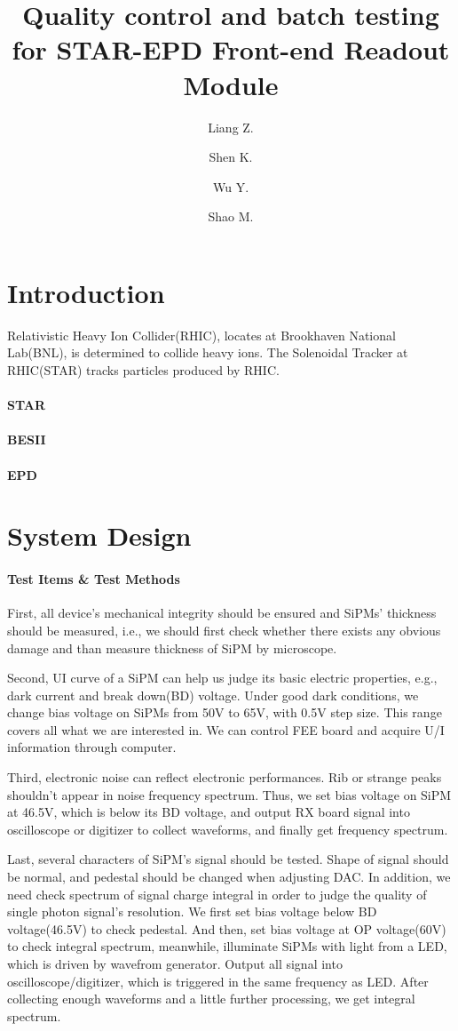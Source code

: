 \documentclass[11pt,a4paper]{article}
\title{Quality control and batch testing for STAR-EPD Front-end Readout Module}
\author[a]{Liang Z.}
\author[a]{Shen K.}
\author[a]{Wu Y.}
\author[a]{Shao M.}
\affiliation[a]{University of Science and Technology of China, JinZhai Road, HEFEI, China}
\begin{document}
\maketitle
\flushbottom

\section{Introduction}
Relativistic Heavy Ion Collider(RHIC), locates at Brookhaven National Lab(BNL), 
is determined to collide heavy ions. The Solenoidal Tracker at RHIC(STAR) tracks
particles produced by RHIC.
\paragraph{STAR}
\paragraph{BESII}
\paragraph{EPD}

\section{System Design}
\paragraph{Test Items \& Test Methods}First, all device's mechanical integrity should be ensured and SiPMs' thickness should be measured,
i.e., we should first check whether there exists any obvious damage and than measure thickness of SiPM by microscope.

Second, UI curve of a SiPM can help us judge its basic electric properties, e.g., dark current and break down(BD) voltage.
Under good dark conditions, we change bias voltage on SiPMs from 50V to 65V, with 0.5V step size. This range covers all what we are interested in.
We can control FEE board and acquire U/I information through computer.

Third, electronic noise can reflect electronic performances. Rib or strange peaks shouldn't appear in noise frequency spectrum. Thus, we set bias voltage on
SiPM at 46.5V, which is below its BD voltage, and output RX board signal into oscilloscope or digitizer to collect waveforms, and finally get frequency spectrum.

Last, several characters of SiPM's signal should be tested. Shape of signal should be normal, and pedestal should be changed when adjusting DAC. In addition, we need check
spectrum of signal charge integral in order to judge the quality of single photon signal's resolution. We first set bias voltage below BD voltage(46.5V) to check pedestal. And
then, set bias voltage at OP voltage(60V) to check integral spectrum, meanwhile, illuminate SiPMs with light from a LED, which is driven by wavefrom generator. Output all signal
into oscilloscope/digitizer, which is triggered in the same frequency as LED. After collecting enough waveforms and a little further processing, we get integral spectrum.
\end{document}
